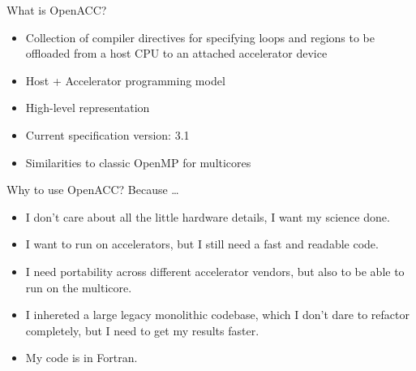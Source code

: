 \documentclass[12pt,aspectratio=169]{beamer}
\begin{document}
\begin{frame}{What is OpenACC?}
  \begin{itemize}
  \item Collection of compiler directives for specifying loops and regions to be
    offloaded from a host CPU to an attached accelerator device
  \item Host + Accelerator programming model
  \item High-level representation
  \item Current specification version: 3.1
  \item Similarities to classic OpenMP for multicores
  \end{itemize}
\end{frame}

\begin{frame}{Why to use OpenACC?}
  Because \dots
  \vspace\baselineskip
  \begin{itemize}
  \item I don't care about all the little hardware details, I want my science done.
  \item I want to run on accelerators, but I still need a fast and readable code.
  \item I need portability across different accelerator vendors, but also to be able to run on the multicore.
  \item I inhereted a large legacy monolithic codebase, which I don't dare to
    refactor completely, but I need to get my results faster.
  \item My code is in Fortran.
  \end{itemize}
\end{frame}
\end{document}
